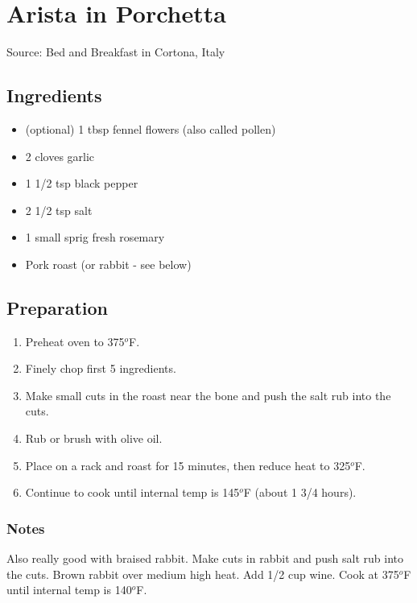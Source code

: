 \section{Arista in Porchetta}

\begin{center}
Source: Bed and Breakfast in Cortona, Italy
\end{center}

\subsection{Ingredients}
\begin{itemize}
    \item (optional) 1 tbsp fennel flowers (also called pollen)
    \item 2 cloves garlic
    \item 1 1/2 tsp black pepper
    \item 2 1/2 tsp salt
    \item 1 small sprig fresh rosemary
    \item Pork roast (or rabbit - see below)
\end{itemize}

\subsection{Preparation}
\begin{enumerate}
    \item Preheat oven to 375$^o$F.
    \item Finely chop first 5 ingredients.
    \item Make small cuts in the roast near the bone and push the salt rub into the cuts.
    \item Rub or brush with olive oil.
    \item Place on a rack and roast for 15 minutes, then reduce heat to 325$^o$F.
    \item Continue to cook until internal temp is 145$^o$F (about 1 3/4 hours).
\end{enumerate}

\subsubsection{Notes}
Also really good with braised rabbit.
Make cuts in rabbit and push salt rub into the cuts.
Brown rabbit over medium high heat.
Add 1/2 cup wine.
Cook at 375$^o$F until internal temp is 140$^o$F.
